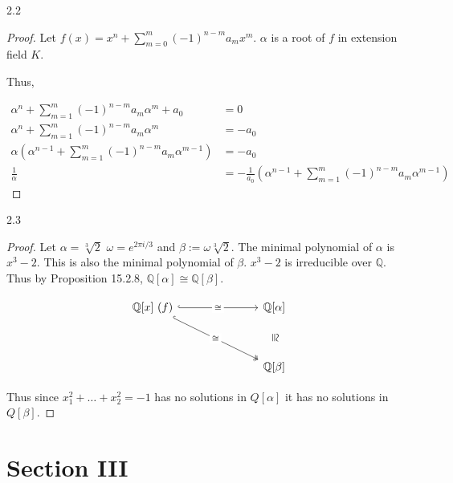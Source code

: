 \documentclass{article}
\newcommand{\Q}{\mathbb{Q}}
\begin{document}
\bigskip

\begin{PROB}{2.2}\label{Problem 2.2.}
\end{PROB}
\begin{proof} 
    Let $f(x) = x^n + \sum_{m = 0}^{m}(-1)^{n - m} a_m x^m$. $\alpha$ is a root of $f$ in extension field $K$. 
    
    Thus, 

    \begin{align*}
        \alpha^n + \sum_{m = 1}^{m}(-1)^{n - m} a_m \alpha^m + a_0 &= 0 \\ 
        \alpha^n + \sum_{m = 1}^{m}(-1)^{n - m} a_m \alpha^m  &= -a_0 \\
        \alpha(\alpha^{n - 1} + \sum_{m = 1}^{m}(-1)^{n - m} a_m \alpha^{m - 1}) &= -a_0\\
        \frac{1}{\alpha} &= -\frac{1}{a_0}\left(\alpha^{n - 1} + \sum_{m = 1}^{m}(-1)^{n - m} a_m \alpha^{m - 1}\right)
    \end{align*}
\end{proof}


\bigskip

\begin{PROB}{2.3}\label{Problem 2.3.}
\end{PROB}
\begin{proof}
    Let $\alpha = \sqrt[3]{2}$  $\omega = e^{2 \pi i / 3}$ and $\beta := \omega \sqrt[3]{2}$. The minimal polynomial of $\alpha$ is $x^3 - 2$. This is also the minimal polynomial of $\beta$. $x^3 - 2$ is irreducible over $\Q$. Thus by Proposition 15.2.8, $\Q[\alpha] \cong \Q[\beta]$. 
    
    \[\begin{tikzcd}
        {\Q[x] \ (f)} &&& {\Q[\alpha]} \\
        \\
        &&& {\Q[\beta]}
        \arrow["\cong"{description}, hook, from=1-1, to=1-4]
        \arrow["\cong"{description}, hook, two heads, from=1-1, to=3-4]
        \arrow["{\cong }"{marking, allow upside down}, draw=none, from=1-4, to=3-4]
    \end{tikzcd}\]

    Thus since $x_1^2 + \dots + x_2^2 = -1$ has no solutions in $Q[\alpha]$ it has no solutions in $Q[\beta]$.   
\end{proof}

\section*{Section III}
\end{document}

